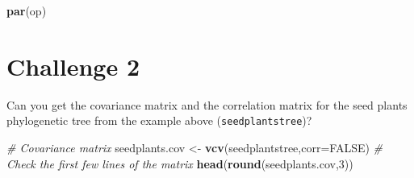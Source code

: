 \documentclass[
]{book}
\newenvironment{Shaded}{\begin{snugshade}}{\end{snugshade}}
\newcommand{\AttributeTok}[1]{\textcolor[rgb]{0.13,0.29,0.53}{#1}}
\newcommand{\CommentTok}[1]{\textcolor[rgb]{0.56,0.35,0.01}{\textit{#1}}}
\newcommand{\ConstantTok}[1]{\textcolor[rgb]{0.56,0.35,0.01}{#1}}
\newcommand{\DecValTok}[1]{\textcolor[rgb]{0.00,0.00,0.81}{#1}}
\newcommand{\FunctionTok}[1]{\textcolor[rgb]{0.13,0.29,0.53}{\textbf{#1}}}
\newcommand{\NormalTok}[1]{#1}
\newcommand{\OtherTok}[1]{\textcolor[rgb]{0.56,0.35,0.01}{#1}}
\begin{document}
\begin{Shaded}
\begin{Highlighting}[]
\FunctionTok{par}\NormalTok{(op)}
\end{Highlighting}
\end{Shaded}

\section{Challenge 2}\label{challenge-2-1}

Can you get the covariance matrix and the correlation matrix for the seed plants phylogenetic tree from the example above (\texttt{seedplantstree})?

\begin{Shaded}
\begin{Highlighting}[]
\CommentTok{\# Covariance matrix}
\NormalTok{seedplants.cov }\OtherTok{\textless{}{-}} \FunctionTok{vcv}\NormalTok{(seedplantstree,}\AttributeTok{corr=}\ConstantTok{FALSE}\NormalTok{)}
\CommentTok{\# Check the first few lines of the matrix}
\FunctionTok{head}\NormalTok{(}\FunctionTok{round}\NormalTok{(seedplants.cov,}\DecValTok{3}\NormalTok{))}
\end{Highlighting}
\end{Shaded}
\end{document}
